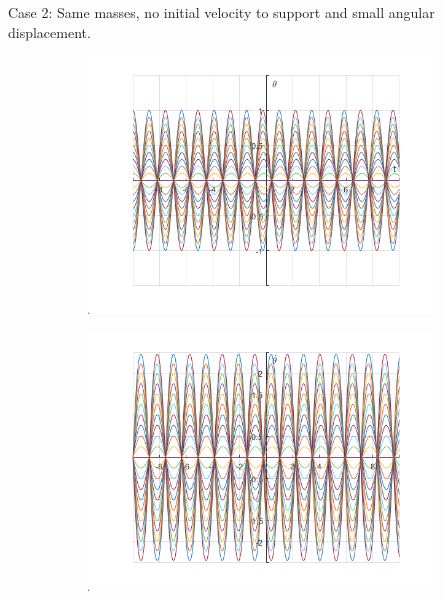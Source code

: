 \documentclass{article}
\begin{document}
	Case 2:
	Same masses, no initial velocity to support and small angular displacement.	
	\graphicspath{{./SmallOscillations/S2} }
	\begin{figure}[h!]
		\centering
		\begin{subfigure}[b]{0.48\linewidth}
			\includegraphics[width=\linewidth]{./SmallOscillations/S2/F1.png}
		\end{subfigure}
		\begin{subfigure}[b]{0.48\linewidth}
			\includegraphics[width=\linewidth]{./SmallOscillations/S2/F2.png}
		\end{subfigure}
	\end{figure}
	
\end{document}
